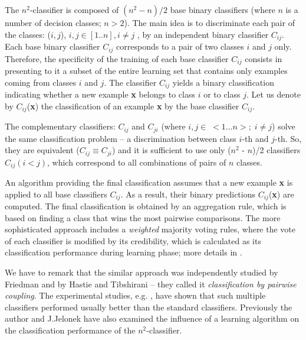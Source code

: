 \documentclass{llncs}
\begin{document}
The $n^2$-classifier is composed of $(n^2-n)/2$ base binary classifiers
(where $n$ is a number of decision classes; $n>2$). The main idea is to
discriminate each pair of the classes: ($i,j $), $i,j \in [ 1..n ], i \neq
j$ , by an independent binary classifier $ C_{ij}$. Each base binary
classifier $C_{ij}$ corresponds to a pair of two classes $i$ and $j$ only.
Therefore, the specificity of the training of each base classifier $C_{ij}$
consists in presenting to it a subset of the entire learning set that
contains only examples coming from classes $i$ and $j$. The classifier
$C_{ij}$ yields a binary classification indicating whether a new example
{\bf x} belongs to class $i$ or to class $j$. Let us denote by $
C_{ij}$({\bf x}) the classification of an example {\bf x} by the base
classifier $C_{ij}$.

The complementary classifiers: $C_{ij}$ and $C_{ji}$ (where $i,j \in \;  <1
\ldots n>; \; i \neq j$) solve the same classification problem -- a
discrimination between class $i$-th and $j$-th. So, they are equivalent
($C_{ij} \equiv C_{ji}$) and it is sufficient to use only ($n^2$ - $n$)/2
classifiers $C_{ij} (i < j)$, which correspond to all combinations of pairs
of $n$ classes.

An algorithm providing the final classification assumes that a new example
{\bf x} is applied to all base classifiers $C_{ij}$. As a result, their
binary predictions $C_{ij}$({\bf x}) are computed. The final classification
is obtained by an aggregation rule, which is based on finding a class that
wins the most pairwise comparisons. The more sophisticated approach includes
a \emph{weighted} majority voting rules, where the vote of each classifier
is modified by its credibility, which is calculated as its classification
performance during learning phase; more details in \cite{JelStef98}.

We have to remark that the similar approach was independently studied by
Friedman \cite {Friedman} and  by Hastie and Tibshirani \cite{Hastie} --
they called it {\em classification by pairwise coupling}. The experimental
studies, e.g. \cite{Friedman,Hastie,JelStef98}, have shown that such
multiple classifiers performed usually better than the standard classifiers.
Previously the author and J.Jelonek have also examined the influence of a
learning algorithm on the classification performance of the
$n^2$-classifier.
\end{document}

